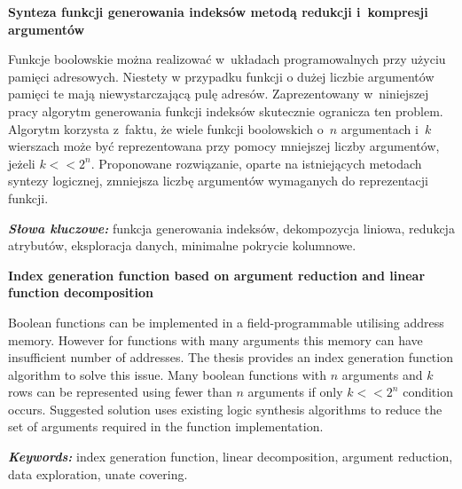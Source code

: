 \newpage
\vspace{10cm}

\newpage
\begin{center}
	\textbf{Synteza funkcji generowania indeksów metodą redukcji i~kompresji argumentów}
\end{center}

Funkcje boolowskie można realizować w~układach programowalnych przy użyciu pamięci adresowych.
Niestety w przypadku funkcji o dużej liczbie argumentów pamięci te mają niewystarczającą pulę adresów.
Zaprezentowany w~niniejszej pracy algorytm generowania funkcji indeksów skutecznie ogranicza ten problem.
Algorytm korzysta z~faktu,
że wiele funkcji boolowskich o~$n$ argumentach i~$k$ wierszach może być reprezentowana przy pomocy mniejszej liczby argumentów,
jeżeli $k<<2^n$.
Proponowane rozwiązanie,
oparte na istniejących metodach syntezy logicznej,
zmniejsza liczbę argumentów wymaganych do reprezentacji funkcji.

\textit{\textbf{Słowa kluczowe:}} funkcja generowania indeksów, dekompozycja liniowa, redukcja atrybutów, eksploracja danych, minimalne pokrycie kolumnowe.

	\vspace{1cm}
\newpage

\begin{center}
    \textbf{Index generation function based on argument reduction and linear function decomposition}
\end{center}

Boolean functions can be implemented in a field-programmable utilising address memory.
However for functions with many arguments this memory can have insufficient number of addresses.
The thesis provides an index generation function algorithm to solve this issue.
Many boolean functions with $n$ arguments and $k$ rows can be represented using fewer than $n$ arguments if only $k<<2^n$ condition occurs.
Suggested solution uses existing logic synthesis algorithms to reduce the set of arguments required in the function implementation.

\textit{\textbf{Keywords:}} index generation function, linear decomposition, argument reduction, data exploration, unate covering.

